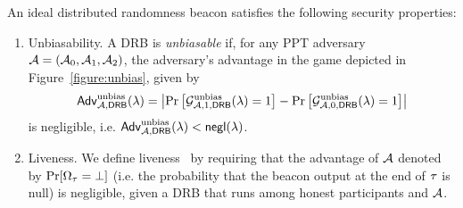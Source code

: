 \begin{definition}
An ideal distributed randomness beacon satisfies the following security properties:
\begin{enumerate}
\item Unbiasability.
A DRB is \textit{unbiasable} if, for any PPT adversary $\mathcal{A} = (\mathcal{A}_0, \mathcal{A}_1, \mathcal{A}_2)$, the adversary's advantage in the game depicted in Figure~\ref{figure:unbias}, given by
\begingroup\makeatletter\def\f@size{8}\check@mathfonts
\begin{equation*}
\mathsf{Adv}^\text{unbias}_{\mathcal{A}, \mathsf{DRB}}(\lambda) = \left|\Pr\left[\mathcal{G}^\text{unbias}_{\mathcal{A}, 1, \mathsf{DRB}}(\lambda) = 1\right] - \Pr\left[\mathcal{G}^\text{unbias}_{\mathcal{A}, 0, \mathsf{DRB}}(\lambda) = 1\right]\right|
\end{equation*}\endgroup
is negligible, i.e. $\mathsf{Adv}^\text{unbias}_{\mathcal{A}, \mathsf{DRB}}(\lambda) < \mathsf{negl}(\lambda)$.

\item Liveness. We define liveness~\cite{cherniaeva2019homomorphic} by requiring that the advantage of $\mathcal{A}$ denoted by $\Pr[\Omega_\tau = \text{$\perp$}]$ (i.e. the probability that the beacon output at the end of \epoch $\tau$ is null) is negligible, given a DRB that runs among honest participants and $\mathcal{A}$.


\end{enumerate}
\end{definition}
